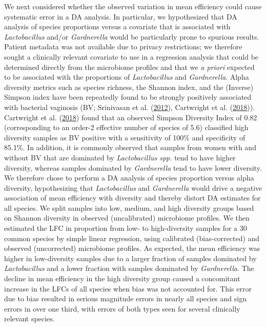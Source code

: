 \documentclass[
]{article}
\begin{document}
We next considered whether the observed variation in mean efficiency could cause systematic error in a DA analysis.
In particular, we hypothesized that DA analysis of species proportions versus a covariate that is associated with \emph{Lactobacillus} and/or \emph{Gardnerella} would be particularly prone to spurious results.
Patient metadata was not available due to privacy restrictions; we therefore sought a clinically relevant covariate to use in a regression analysis that could be determined directly from the microbiome profiles and that we \emph{a priori} expected to be associated with the proportions of \emph{Lactobacillus} and \emph{Gardnerella}.
Alpha diversity metrics such as species richness, the Shannon index, and the (Inverse) Simpson index have been repeatedly found to be strongly positively associated with bacterial vaginosis (BV; Srinivasan et al. (\protect\hyperlink{ref-srinivasan2012bact}{2012}), Cartwright et al. (\protect\hyperlink{ref-cartwright2018mult}{2018})). Cartwright et al. (\protect\hyperlink{ref-cartwright2018mult}{2018}) found that an observed Simpson Diversity Index of 0.82 (corresponding to an order-2 effective number of species of 5.6) classified high diversity samples as BV positive with a sensitivity of 100\% and specificity of 85.1\%.
In addition, it is commonly observed that samples from women with and without BV that are dominated by \emph{Lactobacillus spp.} tend to have higher diversity, whereas samples dominated by \emph{Gardnerella} tend to have lower diversity.
We therefore chose to perform a DA analysis of species proportion versus alpha diversity, hypothesizing that \emph{Lactobacillus} and \emph{Gardnerella} would drive a negative association of mean efficiency with diversity and thereby distort DA estimates for all species.
We split samples into low, medium, and high diversity groups based on Shannon diversity in observed (uncalibrated) microbiome profiles.
We then estimated the LFC in proportion from low- to high-diversity samples for a 30 common species by simple linear regression, using calibrated (bias-corrected) and observed (uncorrected) microbiome profiles.
As expected, the mean efficiency was higher in low-diversity samples due to a larger fraction of samples dominated by \emph{Lactobacillus} and a lower fraction with samples dominated by \emph{Gardnerella}.
The decline in mean efficiency in the high diversity group caused a concomitant increase in the LFCs of all species when bias was not accounted for.
This error due to bias resulted in serious magnitude errors in nearly all species and sign errors in over one third, with errors of both types seen for several clinically relevant species.
\end{document}
